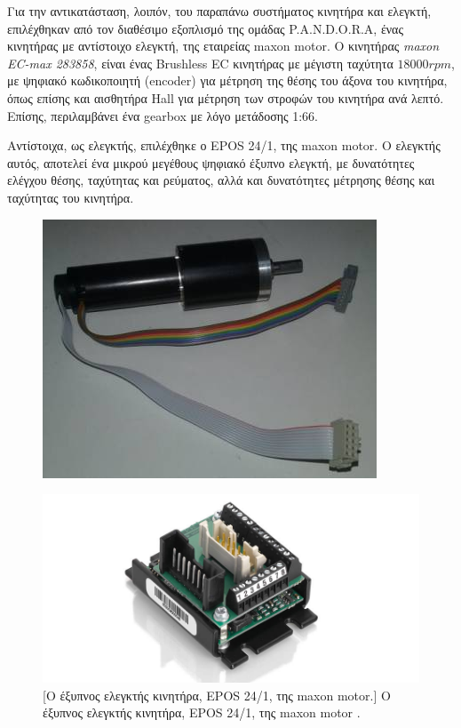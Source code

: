 Για την αντικατάσταση, λοιπόν, του παραπάνω συστήματος κινητήρα και ελεγκτή, επιλέχθηκαν από τον διαθέσιμο εξοπλισμό της ομάδας {P.A.N.D.O.R.A}, ένας κινητήρας με αντίστοιχο ελεγκτή, της εταιρείας {maxon motor}. Ο κινητήρας \textit{maxon EC-max 283858}, είναι ένας {Brushless EC κινητήρας} με μέγιστη ταχύτητα $18000rpm$, με {ψηφιακό κωδικοποιητή (encoder)} για μέτρηση της θέσης του άξονα του κινητήρα, όπως επίσης και {αισθητήρα Hall} για μέτρηση των στροφών του κινητήρα ανά λεπτό. Επίσης, περιλαμβάνει ένα gearbox με λόγο μετάδοσης 1:66. 

\bigskip
Αντίστοιχα, ως ελεγκτής, επιλέχθηκε ο {EPOS 24/1}, της {maxon motor}. Ο ελεγκτής αυτός, αποτελεί ένα μικρού μεγέθους ψηφιακό έξυπνο ελεγκτή, με δυνατότητες ελέγχου 
θέσης, ταχύτητας και ρεύματος, αλλά και δυνατότητες μέτρησης θέσης και ταχύτητας του κινητήρα.

\begin{figure}[!ht]
	\begin{minipage}[b]{.49\textwidth}		
		\centering
		\includegraphics[width=0.8\linewidth]{Chapters/Chapter2/Figures/maxon_motor_ec_283858.jpg}
		\label{fig:maxon_motor}
	\end{minipage}
	\begin{minipage}[b]{.5\textwidth}
 	\centering
		\includegraphics[width=0.8\linewidth]{Chapters/Chapter2/Figures/epos241.jpg}
		[Ο έξυπνος ελεγκτής κινητήρα, EPOS 24/1, της maxon motor.]{
			Ο έξυπνος ελεγκτής κινητήρα, EPOS 24/1, της maxon motor \cite{epos241_manual}.}	
		\label{fig:epos241}
	\end{minipage}
\end{figure}

